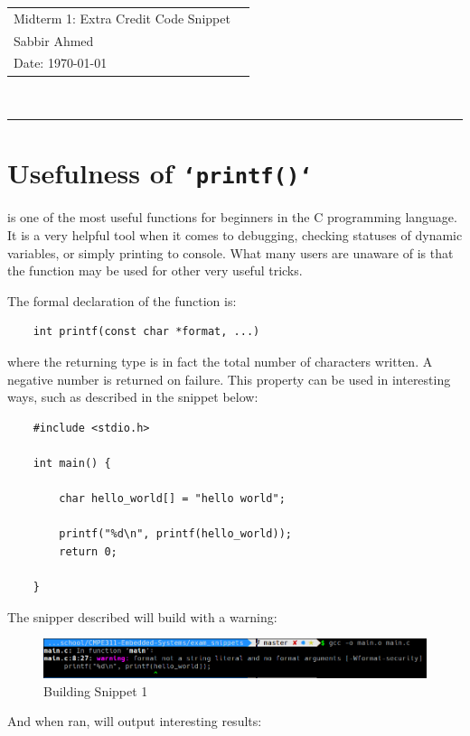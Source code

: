 \documentclass[paper=usletter, fontsize=12pt]{article}
\newcommand{\documentinfo}[5]{
    \begin{centering}
        \parbox{2in}{
        \begin{spacing}{1}
            \begin{flushleft}
                \begin{tabular}{l l}
                    #1 \\
                    #2 \\
                    #3 \\
                \end{tabular}\\
                \rule{\textwidth}{1pt}
            \end{flushleft}
        \end{spacing}
        }
    \end{centering}
}
\begin{document}
    \documentinfo{Midterm 1: Extra Credit Code Snippet}{Sabbir Ahmed}{Date: \today}
    \vspace{-0.1in}

    \section{Usefulness of \texttt{`printf()`}}
     is one of the most useful functions for beginners in the C programming language. It is a very helpful tool when it comes to debugging, checking statuses of dynamic variables, or simply printing to console. What many users are unaware of is that the function may be used for other very useful tricks.

    The formal declaration of the function is:

\begin{lstlisting}
    int printf(const char *format, ...)
\end{lstlisting}

    where the returning type  is in fact the total number of characters written. A negative number is returned on failure. This property can be used in interesting ways, such as described in the snippet below: \\

\begin{lstlisting}
    #include <stdio.h>

    int main() {

        char hello_world[] = "hello world";

        printf("%d\n", printf(hello_world));
        return 0;

    }
\end{lstlisting}

    The snipper described will build with a warning:

    \begin{figure}[ht]
        \begin{center}
            \includegraphics[width=1\textwidth]{build1.png}
            \caption{Building Snippet 1} \label{fig:build1}
        \end{center}
    \end{figure}

    And when ran, will output interesting results:
\end{document}

